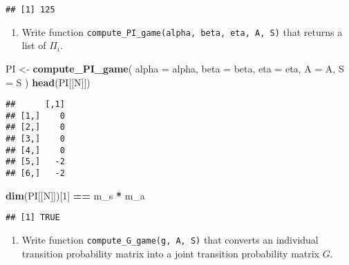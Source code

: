 \documentclass[
]{book}
\newenvironment{Shaded}{\begin{snugshade}}{\end{snugshade}}
\newcommand{\AttributeTok}[1]{\textcolor[rgb]{0.13,0.29,0.53}{#1}}
\newcommand{\DecValTok}[1]{\textcolor[rgb]{0.00,0.00,0.81}{#1}}
\newcommand{\FunctionTok}[1]{\textcolor[rgb]{0.13,0.29,0.53}{\textbf{#1}}}
\newcommand{\NormalTok}[1]{#1}
\newcommand{\OtherTok}[1]{\textcolor[rgb]{0.56,0.35,0.01}{#1}}
\newcommand{\SpecialCharTok}[1]{\textcolor[rgb]{0.81,0.36,0.00}{\textbf{#1}}}
\providecommand{\tightlist}{%
  \setlength{\itemsep}{0pt}\setlength{\parskip}{0pt}}
\begin{document}
\begin{Shaded}
\end{Shaded}

\begin{verbatim}
## [1] 125
\end{verbatim}

\begin{enumerate}
\def\labelenumi{\arabic{enumi}.}
\setcounter{enumi}{2}
\tightlist
\item
  Write function \texttt{compute\_PI\_game(alpha,\ beta,\ eta,\ A,\ S)} that returns a list of \(\Pi_i\).
\end{enumerate}

\begin{Shaded}
\begin{Highlighting}[]
\NormalTok{PI }\OtherTok{\textless{}{-}} 
  \FunctionTok{compute\_PI\_game}\NormalTok{(}
    \AttributeTok{alpha =}\NormalTok{ alpha, }
    \AttributeTok{beta =}\NormalTok{ beta, }
    \AttributeTok{eta =}\NormalTok{ eta, }
    \AttributeTok{A =}\NormalTok{ A,}
    \AttributeTok{S =}\NormalTok{ S}
\NormalTok{    )}
\FunctionTok{head}\NormalTok{(PI[[N]])}
\end{Highlighting}
\end{Shaded}

\begin{verbatim}
##      [,1]
## [1,]    0
## [2,]    0
## [3,]    0
## [4,]    0
## [5,]   -2
## [6,]   -2
\end{verbatim}

\begin{Shaded}
\begin{Highlighting}[]
\FunctionTok{dim}\NormalTok{(PI[[N]])[}\DecValTok{1}\NormalTok{] }\SpecialCharTok{==}\NormalTok{ m\_s }\SpecialCharTok{*}\NormalTok{ m\_a}
\end{Highlighting}
\end{Shaded}

\begin{verbatim}
## [1] TRUE
\end{verbatim}

\begin{enumerate}
\def\labelenumi{\arabic{enumi}.}
\setcounter{enumi}{3}
\tightlist
\item
  Write function \texttt{compute\_G\_game(g,\ A,\ S)} that converts an individual transition probability matrix into a joint transition probability matrix \(G\).
\end{enumerate}
\end{document}
